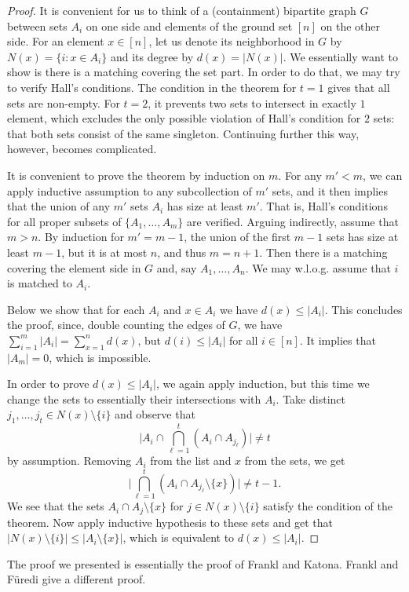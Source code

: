 \documentclass[graybox]{svmult}
\renewcommand{\le}{\leqslant}
\begin{document}
\begin{proof} It is convenient for us to think of a (containment) bipartite graph $G$ between sets $A_i$ on one side and elements of the ground set $[n]$ on the other side. For an element $x\in[n]$, let us denote its neighborhood in $G$ by $N(x) = \{i: x\in A_i\}$ and its degree by $d(x)  =|N(x)|$. We essentially want to show is there is a matching covering the set part. In order to do that, we may try to verify Hall's conditions. The condition in the theorem for $t=1$ gives that all sets are non-empty. For $t=2$, it prevents two sets to intersect in exactly $1$ element, which excludes the only possible violation of Hall's condition for $2$ sets: that both sets consist of the same singleton. Continuing further this way, however, becomes complicated.

It is convenient to prove the theorem by induction on $m$. For any $m'<m$, we can apply inductive assumption to any subcollection of $m'$ sets, and it then implies that the union of any $m'$ sets $A_i$ has size at least $m'$. That is, Hall's conditions for all proper subsets of $\{A_1,\ldots, A_m\}$ are verified. Arguing indirectly, assume that $m>n$. By induction for $m'= m-1$, the union of the first $m-1$ sets has size at least $m-1$, but it is at most $n$, and thus $m = n+1$. Then there is a matching covering the element side in $G$ and, say $A_1,\ldots, A_n$. We may w.l.o.g. assume that $i$ is matched to $A_i$.

Below we show that for each $A_i$ and $x\in A_i$ we have $d(x)\le |A_i|$. This concludes the proof, since, double counting the edges of $G$, we have $\sum_{i=1}^m|A_i| = \sum_{x=1}^n d(x)$, but $d(i)\le |A_i|$ for all $i\in[n]$. It implies that $|A_{m}| = 0$, which is impossible. %

In order to prove $d(x)\le |A_i|$, we again apply induction, but this time we change the sets to essentially their intersections with $A_i$. Take distinct $j_1,\ldots, j_t\in  N(x)\setminus \{i\}$ and observe that $$\Big|A_i\cap \bigcap_{\ell=1}^t (A_i\cap A_{j_\ell})\Big|\ne t$$
by assumption. Removing $A_i$ from the list and $x$ from the sets, we get
$$\Big|\bigcap_{\ell=1}^t (A_i\cap A_{j_\ell}\setminus \{x\})\Big|\ne t-1.$$
We see that the sets $A_i\cap A_j\setminus \{x\}$  for $j\in N(x)\setminus \{i\}$    satisfy the condition of the theorem. Now apply inductive hypothesis to these sets and get that $|N(x)\setminus \{i\}|\le |A_i\setminus \{x\}|$, which is equivalent to $d(x)\le |A_i|$.
\end{proof}
The proof we presented is essentially the proof of Frankl and Katona. Frankl and F\"uredi \cite{FF1} give a different proof.
\end{document}
